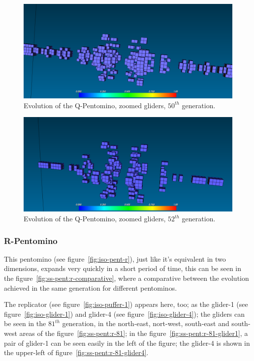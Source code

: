 \begin{figure}
	\centering
	\includegraphics[scale=0.3]{pentominoes_ss/q_50_gliders.png}
	\caption{Evolution of the Q-Pentomino, zoomed gliders, $50^{th}$ generation.}
  \label{fig:ss-pent:q-50-gliders}
\end{figure}

\begin{figure}
	\centering
	\includegraphics[scale=0.3]{pentominoes_ss/q_52_gliders.png}
	\caption{Evolution of the Q-Pentomino, zoomed gliders, $52^{th}$ generation.}
  \label{fig:ss-pent:q-52-gliders}
\end{figure}

\subsubsection{R-Pentomino}
\label{sec:r-pentomino}
This pentomino (see figure~\ref{fig:iso-pent-r}), just like it's equivalent in
two dimensions, expands very quickly in a short period of time, this can be seen
in the figure~\ref{fig:ss-pent:r-comparative}, where a comparative between the
evolution achieved in the same generation for different pentominos.

The replicator (see figure~\ref{fig:iso-puffer-1}) appears here, too; as the
glider-1 (see figure~\ref{fig:iso-glider-1}) and glider-4 (see
figure~\ref{fig:iso-glider-4}); the gliders can be seen in the  $81^{th}$
generation, in the north-east, nort-west, south-east and south-west areas of the
figure~\ref{fig:ss-pent:r-81}; in the figure~\ref{fig:ss-pent:r-81-glider1}, a
pair of glider-1 can be seen easily in the left of the figure; the glider-4 is
shown in the upper-left of figure~\ref{fig:ss-pent:r-81-glider4}.

